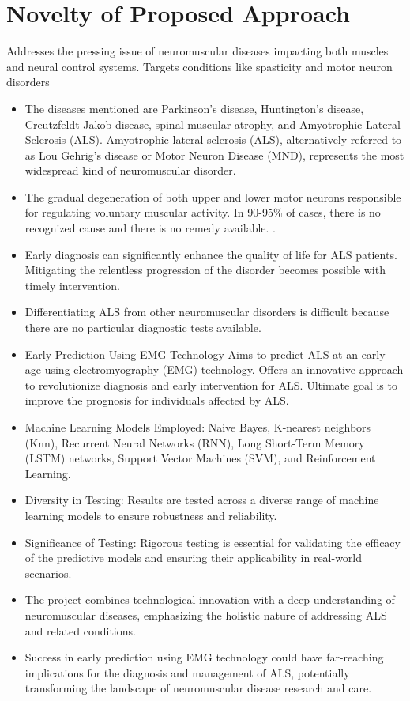 \documentclass[ 12pt,a4paper,twocolumn,fleqn]{report}
\begin{document}
\section{Novelty of Proposed Approach }
\vspace{2mm}
Addresses the pressing issue of neuromuscular diseases impacting both muscles and neural control
systems. Targets conditions like spasticity and motor neuron disorders
\begin{itemize}
    \item The diseases mentioned are Parkinson's disease, Huntington's disease, Creutzfeldt-Jakob disease, spinal muscular atrophy, and Amyotrophic Lateral Sclerosis (ALS). Amyotrophic lateral sclerosis (ALS), alternatively referred to as Lou Gehrig's disease or Motor Neuron Disease (MND), represents the most widespread kind of neuromuscular disorder.
    \item The gradual degeneration of both upper and lower motor neurons responsible for regulating voluntary muscular activity. In 90-95\% of cases, there is no recognized cause and there is no remedy available.
. 
    \item Early diagnosis can significantly enhance the quality of life for ALS patients. Mitigating the relentless progression of the disorder becomes possible with timely intervention. 
    \item Differentiating ALS from other neuromuscular disorders is difficult because there are no particular diagnostic tests available. 
    \item Early Prediction Using EMG Technology Aims to predict ALS at an early age using electromyography (EMG) technology. Offers an innovative approach to revolutionize diagnosis and early intervention for ALS. Ultimate goal is to improve the prognosis for individuals affected by ALS. 
    \item Machine Learning Models Employed: Naive Bayes, K-nearest neighbors (Knn), Recurrent Neural Networks (RNN), Long Short-Term Memory (LSTM) networks, Support Vector Machines (SVM), and Reinforcement Learning. 
    \item Diversity in Testing: Results are tested across a diverse range of machine learning models to ensure robustness and reliability. 
    \item Significance of Testing: Rigorous testing is essential for validating the efficacy of the predictive models and ensuring their applicability in real-world scenarios. 
    \item The project combines technological innovation with a deep understanding of neuromuscular diseases, emphasizing the holistic nature of addressing ALS and related conditions.
    \item Success in early prediction using EMG technology could have far-reaching implications for the diagnosis and management of ALS, potentially transforming the landscape of neuromuscular disease research and care.
\end{itemize}
\newpage
  \pagestyle{fancy}
\thisfancypage{%
  \setlength{\fboxsep}{14pt}\doublebox}{}
\normalsize
\end{document}
